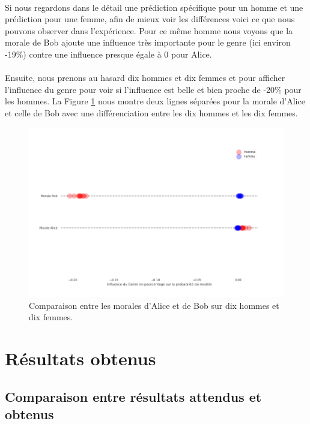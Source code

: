 \documentclass[10pt, french, a4paper]{report}
\begin{document}
\paragraph{}
Si nous regardons dans le détail une prédiction spécifique pour un homme et une prédiction pour une femme, afin de mieux voir les différences voici ce que nous pouvons observer dans l'expérience. Pour ce même homme nous voyons que la morale de Bob ajoute une influence très importante pour le genre (ici environ -19\%) contre une influence presque égale à 0 pour Alice. 

\paragraph{}
Ensuite, nous prenons au hasard dix hommes et dix femmes et pour afficher l'influence du genre pour voir si l'influence est belle et bien proche de -20\% pour les hommes. La Figure \ref{fig:comparaison_morale} nous montre deux lignes séparées pour la morale d'Alice et celle de Bob avec une différenciation entre les dix hommes et les dix femmes.

\begin{figure}[hbt!]
  \centering
  \includegraphics[width=\textwidth]{images/comparaison_local_influence.png}
  \caption{Comparaison entre les morales d'Alice et de Bob sur dix hommes et dix femmes.}
  \label{fig:comparaison_morale}
\end{figure}

\section{Résultats obtenus}

\subsection{Comparaison entre résultats attendus et obtenus}
\end{document}
